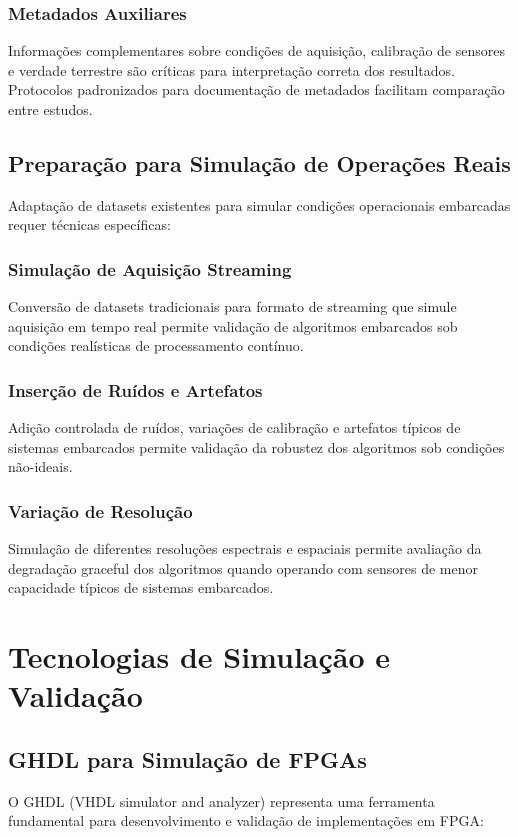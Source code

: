 \subsubsection{Metadados Auxiliares}
Informações complementares sobre condições de aquisição, calibração de sensores e verdade terrestre são críticas para interpretação correta dos resultados. Protocolos padronizados para documentação de metadados facilitam comparação entre estudos.

\subsection{Preparação para Simulação de Operações Reais}
Adaptação de datasets existentes para simular condições operacionais embarcadas requer técnicas específicas:

\subsubsection{Simulação de Aquisição Streaming}
Conversão de datasets tradicionais para formato de streaming que simule aquisição em tempo real permite validação de algoritmos embarcados sob condições realísticas de processamento contínuo.

\subsubsection{Inserção de Ruídos e Artefatos}
Adição controlada de ruídos, variações de calibração e artefatos típicos de sistemas embarcados permite validação da robustez dos algoritmos sob condições não-ideais.

\subsubsection{Variação de Resolução}
Simulação de diferentes resoluções espectrais e espaciais permite avaliação da degradação graceful dos algoritmos quando operando com sensores de menor capacidade típicos de sistemas embarcados.

\section{Tecnologias de Simulação e Validação}\label{sec:simulacao_validacao}

\subsection{GHDL para Simulação de FPGAs}
O GHDL (VHDL simulator and analyzer) representa uma ferramenta fundamental para desenvolvimento e validação de implementações em FPGA:

